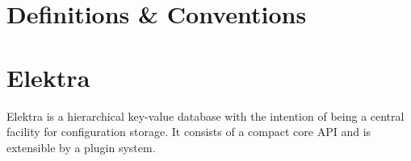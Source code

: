 \section{Definitions \& Conventions}



\section{Elektra}

Elektra is a hierarchical key-value database with the intention of being a central facility for configuration storage.
It consists of a compact core API and is extensible by a plugin system. 

